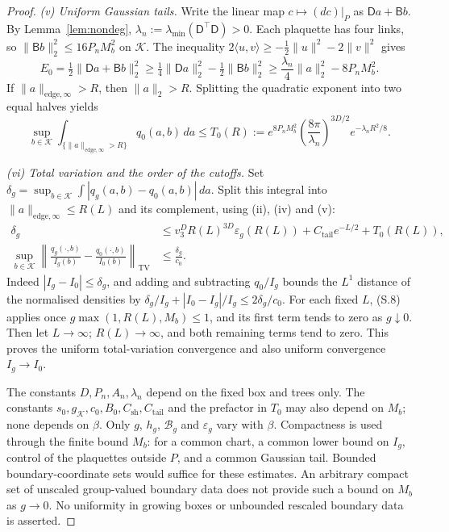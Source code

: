 \documentclass[11pt,a4paper]{article}
\theoremstyle{plain}
\theoremstyle{definition}
\theoremstyle{remark}
\numberwithin{equation}{section}
\begin{document}
\begin{proof}
\emph{(v) Uniform Gaussian tails.}
Write the linear map $c\mapsto (dc)|_P$ as $\mathsf D a+\mathsf B b$.
By Lemma~\ref{lem:nondeg}, $\lambda_n:=\lambda_{\min}(\mathsf D^\top\mathsf D)>0$.
Each plaquette has four links, so $\|\mathsf B b\|_2^2\le16P_n M_b^2$ on $\mathcal K$.
The inequality $2\langle u,v\rangle\ge-\frac12\|u\|^2-2\|v\|^2$ gives
\[
E_0=\tfrac12\|\mathsf D a+\mathsf B b\|_2^2
\ge\tfrac14\|\mathsf D a\|_2^2-\tfrac12\|\mathsf B b\|_2^2
\ge\frac{\lambda_n}{4}\|a\|_2^2-8P_nM_b^2.
\]
If $\|a\|_{\mathrm{edge},\infty}>R$, then $\|a\|_2>R$. Splitting the quadratic exponent into two equal halves yields
\begin{equation*}\tag{S.7}\label{eq:S-Gaussian-tail}
\sup_{b\in\mathcal K}\int_{\{\|a\|_{\mathrm{edge},\infty}>R\}}q_0(a,b)\,da
\le T_0(R):=e^{8P_nM_b^2}\left(\frac{8\pi}{\lambda_n}\right)^{3D/2}e^{-\lambda_n R^2/8}.
\end{equation*}

\emph{(vi) Total variation and the order of the cutoffs.}
Set $\delta_g=\sup_{b\in\mathcal K}\int|q_g(a,b)-q_0(a,b)|\,da$.
Split this integral into $\|a\|_{\mathrm{edge},\infty}\le R(L)$ and its complement, using (ii), (iv) and (v):
\begin{equation*}\tag{S.8}\label{eq:S-TV}
\begin{split}
\delta_g&\le v_3^D R(L)^{3D}\varepsilon_g(R(L))
                  +C_{\mathrm{tail}}e^{-L/2}+T_0(R(L)),\\
\sup_{b\in\mathcal K}\left\|\frac{q_g(\cdot,b)}{I_g(b)}-\frac{q_0(\cdot,b)}{I_0(b)}\right\|_{\mathrm{TV}}
&\le\frac{\delta_g}{c_0}.
\end{split}
\end{equation*}
Indeed $|I_g-I_0|\le\delta_g$, and adding and subtracting $q_0/I_g$ bounds the $L^1$ distance of the normalised densities by
$\delta_g/I_g+|I_0-I_g|/I_g\le2\delta_g/c_0$.
For each fixed $L$, (S.8) applies once $g\max(1,R(L),M_b)\le1$, and its first term tends to zero as $g\downarrow0$.
Then let $L\to\infty$; $R(L)\to\infty$, and both remaining terms tend to zero.
This proves the uniform total-variation convergence and also uniform convergence $I_g\to I_0$.

The constants $D,P_n,A_n,\lambda_n$ depend on the fixed box and trees only.
The constants $s_0,g_{\mathcal K},c_0,B_0,C_{\mathrm{sh}},C_{\mathrm{tail}}$ and the prefactor in $T_0$ may also depend on $M_b$;
none depends on $\beta$. Only $g$, $h_g$, $\mathcal B_g$ and $\varepsilon_g$ vary with $\beta$.
Compactness is used through the finite bound $M_b$: for a common chart, a common lower bound on $I_g$, control of the
plaquettes outside $P$, and a common Gaussian tail. Bounded boundary-coordinate sets would suffice for these estimates.
An arbitrary compact set of unscaled group-valued boundary data does not provide such a bound on $M_b$ as $g\to0$.
No uniformity in growing boxes or unbounded rescaled boundary data is asserted.
\end{proof}
\end{document}

